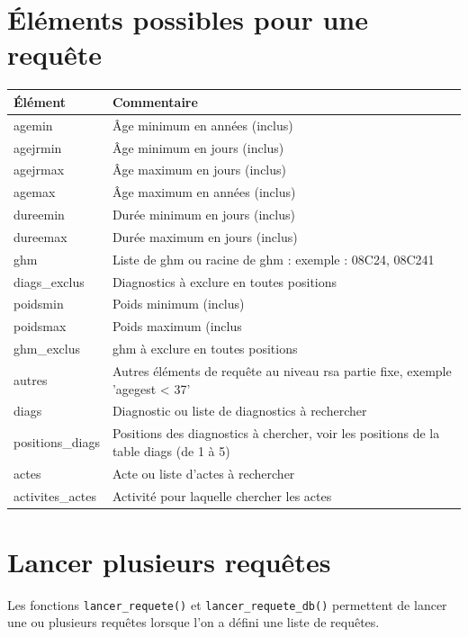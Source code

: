 \documentclass[]{book}
\begin{document}
\hypertarget{elements-possibles-pour-une-requete}{%
\section{Éléments possibles pour une requête}\label{elements-possibles-pour-une-requete}}

\begin{tabular}{l|l}
\hline
Élément & Commentaire\\
\hline
agemin & Âge minimum en années (inclus)\\
\hline
agejrmin & Âge minimum en jours (inclus)\\
\hline
agejrmax & Âge maximum en jours (inclus)\\
\hline
agemax & Âge maximum en années (inclus)\\
\hline
dureemin & Durée minimum en jours (inclus)\\
\hline
dureemax & Durée maximum en jours (inclus)\\
\hline
ghm & Liste de ghm ou racine de ghm : exemple : 08C24, 08C241\\
\hline
diags\_exclus & Diagnostics à exclure en toutes positions\\
\hline
poidsmin & Poids minimum (inclus)\\
\hline
poidsmax & Poids maximum (inclus\\
\hline
ghm\_exclus & ghm à exclure en toutes positions\\
\hline
autres & Autres éléments de requête au niveau rsa partie fixe, exemple 'agegest < 37'\\
\hline
diags & Diagnostic ou liste de diagnostics à rechercher\\
\hline
positions\_diags & Positions des diagnostics à chercher, voir les positions de la table diags (de 1 à 5)\\
\hline
actes & Acte ou liste d'actes à rechercher\\
\hline
activites\_actes & Activité pour laquelle chercher les actes\\
\hline
\end{tabular}

\hypertarget{lancer-plusieurs-requetes}{%
\section{Lancer plusieurs requêtes}\label{lancer-plusieurs-requetes}}

Les fonctions \texttt{lancer\_requete()} et \texttt{lancer\_requete\_db()} permettent de lancer une ou plusieurs requêtes lorsque l'on a défini une liste de requêtes.
\end{document}
